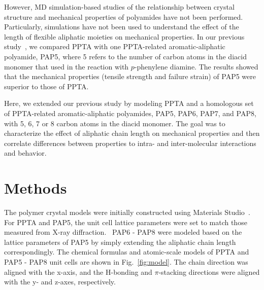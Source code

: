 \documentclass[journal=langd5,manuscript=article]{achemso}
\begin{document}
However, MD simulation-based studies of the relationship between crystal structure and mechanical properties of polyamides have not been performed.
Particularly, simulations have not been used to understand the effect of the length of flexible aliphatic moieties on mechanical properties.
In our previous study~\cite{yang2021molecular}, we compared PPTA with one PPTA-related aromatic-aliphatic polyamide, PAP5, where 5 refers to the number of carbon atoms in the diacid monomer that used in the reaction with $p$-phenylene diamine. 
The results showed that the mechanical properties (tensile strength and failure strain) of PAP5 were superior to those of PPTA.

Here, we extended our previous study by modeling PPTA and a homologous set of PPTA-related aromatic-aliphatic polyamides, PAP5, PAP6, PAP7, and PAP8, with 5, 6, 7 or 8 carbon atoms in the diacid monomer.
The goal was to characterize the effect of aliphatic chain length on mechanical properties and then correlate differences between properties to intra- and inter-molecular interactions and behavior.



\FloatBarrier
\section{Methods}

The polymer crystal models were initially constructed using Materials Studio~\cite{MaterialStudio}.
For PPTA and PAP5, the unit cell lattice parameters were set to match those measured from X-ray diffraction.~\cite{deshmukh2016conformational} 
PAP6 - PAP8 were modeled based on the lattice parameters of PAP5 by simply extending the aliphatic chain length correspondingly.
The chemical formulas and atomic-scale models of PPTA and PAP5 - PAP8 unit cells are shown in Fig.~\ref{fig:model}. 
The chain direction was aligned with the x-axis, and the H-bonding and $\pi$-stacking directions were aligned with the y- and z-axes, respectively.
\end{document}
